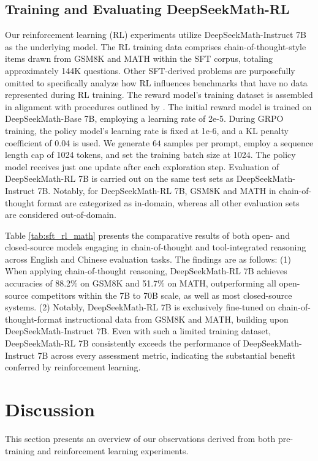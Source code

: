 \begin{itemize}[topsep=0pt]
\begin{itemize}[topsep=0pt]
\subsection{Training and Evaluating DeepSeekMath-RL}

Our reinforcement learning (RL) experiments utilize DeepSeekMath-Instruct 7B as the underlying model. The RL training data comprises chain-of-thought-style items drawn from GSM8K and MATH within the SFT corpus, totaling approximately 144K questions. Other SFT-derived problems are purposefully omitted to specifically analyze how RL influences benchmarks that have no data represented during RL training. The reward model’s training dataset is assembled in alignment with procedures outlined by \citep{wang2023math}. The initial reward model is trained on DeepSeekMath-Base 7B, employing a learning rate of 2e-5. During GRPO training, the policy model’s learning rate is fixed at 1e-6, and a KL penalty coefficient of 0.04 is used. We generate $64$ samples per prompt, employ a sequence length cap of 1024 tokens, and set the training batch size at 1024. The policy model receives just one update after each exploration step. Evaluation of DeepSeekMath-RL 7B is carried out on the same test sets as DeepSeekMath-Instruct 7B. Notably, for DeepSeekMath-RL 7B, GSM8K and MATH in chain-of-thought format are categorized as in-domain, whereas all other evaluation sets are considered out-of-domain.

Table \ref{tab:sft_rl_math} presents the comparative results of both open- and closed-source models engaging in chain-of-thought and tool-integrated reasoning across English and Chinese evaluation tasks. The findings are as follows: (1) When applying chain-of-thought reasoning, DeepSeekMath-RL 7B achieves accuracies of 88.2\% on GSM8K and 51.7\% on MATH, outperforming all open-source competitors within the 7B to 70B scale, as well as most closed-source systems. (2) Notably, DeepSeekMath-RL 7B is exclusively fine-tuned on chain-of-thought-format instructional data from GSM8K and MATH, building upon DeepSeekMath-Instruct 7B. Even with such a limited training dataset, DeepSeekMath-RL 7B consistently exceeds the performance of DeepSeekMath-Instruct 7B across every assessment metric, indicating the substantial benefit conferred by reinforcement learning.

\section{Discussion}
This section presents an overview of our observations derived from both pre-training and reinforcement learning experiments.


\end{itemize}
\end{itemize}
